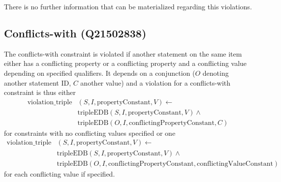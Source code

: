 \documentclass[hyperref,bachelorofscience,fleqn]{cgvpub}
\begin{document}
There is no further information that can be materialized regarding this violations.

\subsection{Conflicts-with (Q21502838)}
The conflicts-with constraint is violated if another statement on the same item either has a conflicting property or a conflicting property and a conflicting value depending on specified qualifiers. It depends on a conjunction (\(O\) denoting another statement ID, \(C\) another value) and a violation for a conflicts-with constraint is thus either
\begin{equation*}
\begin{split}
\text{violation\_triple}&(S, I, \text{propertyConstant}, V) \leftarrow\\
&\text{tripleEDB}(S, I, \text{propertyConstant}, V) \wedge\\
&\text{tripleEDB}(O, I, \text{conflictingPropertyConstant}, C)
\end{split}
\end{equation*}
for constraints with no conflicting values specified or one
\begin{equation*}
\begin{split}
\text{violation\_triple}&(S, I, \text{propertyConstant}, V) \leftarrow\\
&\text{tripleEDB}(S, I, \text{propertyConstant}, V) \wedge\\
&\text{tripleEDB}(O, I, \text{conflictingPropertyConstant}, \text{conflictingValueConstant})
\end{split}
\end{equation*}
for each conflicting value if specified.\\
\end{document}
